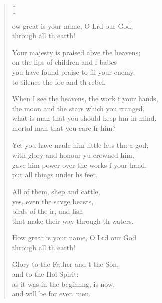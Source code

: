 \settowidth{\versewidth}{When I see the heavens, the work of your hand,}
\begin{verse}[\versewidth]
  \begin{patverse}

ow great is your name, O Lrd our God,\Med\\
through all th earth!

Your majesty is praised abve the heavens;\Med\\
on the lips of children and f babes\\
you have found praise to fil your enemy,\Med\\
to silence the foe and th rebel.

When I see the heavens, the work f your hands,\Med\\
the moon and the stars which you rranged,\\
what is man that you should keep h\pointup{\i}m in mind,\Med\\
mortal man that you care fr him?

Yet you have made him little less thn a god;\Med\\
with glory and honour yu crowned him,\\
gave him power over the works f your hand,\Med\\
put all things under h\pointup{\i}s feet.

All of them, shep and cattle,\Med\\
yes, even the savge beasts,\\
birds of the ir, and fish\Med\\
that make their way through th waters.

How great is your name, O Lrd our God\\
through all th earth!

Glory to the Father and t the Son,\Med\\
and to the Hol Spirit:\\
as it was in the beginn\pointup{\i}ng, is now,\Med\\
and will be for ever. men.
  \end{patverse}
  \end{verse}
